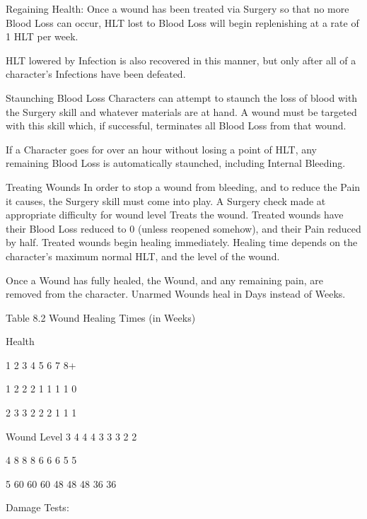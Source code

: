 \documentclass[oneside,11pt,english]{book}
\begin{document}
Regaining Health: 
Once a wound has been treated via Surgery so that no more Blood Loss can occur, HLT lost to Blood 
Loss will begin replenishing at a rate of 1 HLT per week. 

 

HLT lowered by Infection is also recovered in this manner, but only after all of a character’s Infections 
have been defeated. 

 

Staunching Blood Loss 
Characters can attempt to staunch the loss of blood with the Surgery skill and whatever materials are at 
hand. A wound must be targeted with this skill which, if successful, terminates all Blood Loss from that 
wound. 

 

If a Character goes for over an hour without losing a point of HLT, any remaining Blood Loss is 
automatically staunched, including Internal Bleeding. 

 

Treating Wounds 
In order to stop a wound from bleeding, and to reduce the Pain it causes, the Surgery skill must come into 
play. A Surgery check made at appropriate difficulty for wound level Treats the wound. Treated wounds 
have their Blood Loss reduced to 0 (unless reopened somehow), and their Pain reduced by half. Treated 
wounds begin healing immediately. Healing time depends on the character’s maximum normal HLT, and 
the level of the wound. 

 

Once a Wound has fully healed, the Wound, and any remaining pain, are removed from the character. 
Unarmed Wounds heal in Days instead of Weeks. 

 

 

 

 

 

 

Table 8.2 Wound Healing Times (in Weeks) 


 Health 

 1 2 3 4 5 6 7 8+ 

 1 2 2 2 1 1 1 1 0 

 2 3 3 2 2 2 1 1 1 

Wound Level 3 4 4 4 3 3 3 2 2 

 4 8 8 8 6 6 6 5 5 

 5 60 60 60 48 48 48 36 36 

 
Damage Tests: 

 
\end{document}
